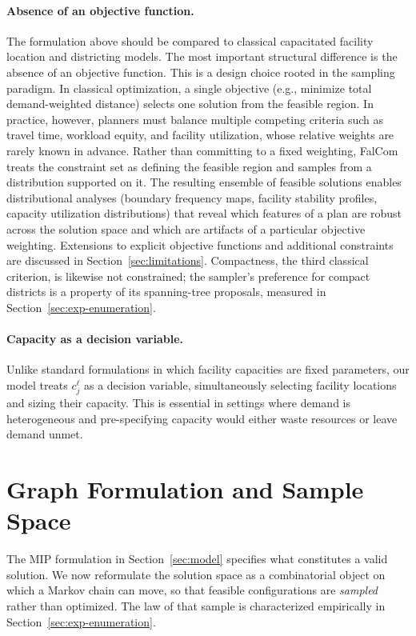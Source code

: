 \documentclass[preprint,12pt,authoryear]{elsarticle}
\theoremstyle{definition}
\begin{document}
\paragraph{Absence of an objective function.}
The formulation above should be compared to classical capacitated facility
location and districting models.  The most important structural difference is
the absence of an objective function.  This is a design choice
rooted in the sampling paradigm.  In classical optimization, a single objective
(e.g., minimize total demand-weighted distance) selects one solution from the
feasible region.  In practice, however, planners must balance multiple
competing criteria such as travel time, workload equity, and facility
utilization, whose relative weights are rarely known in advance.
Rather than committing to a fixed weighting, FalCom treats the constraint set
as defining the feasible region and samples from a distribution supported on
it.  The resulting ensemble of feasible solutions
enables distributional analyses (boundary frequency maps, facility stability
profiles, capacity utilization distributions) that reveal which features of a
plan are robust across the solution space and which are artifacts of a
particular objective weighting.  Extensions to
explicit objective functions and additional constraints are discussed in Section~\ref{sec:limitations}. Compactness, the third classical criterion, is likewise not constrained; the sampler's preference for compact districts is a property of its spanning-tree proposals, measured in Section~\ref{sec:exp-enumeration}.

\paragraph{Capacity as a decision variable.}
Unlike standard formulations in which facility capacities are fixed parameters,
our model treats $c^{\ell}_j$ as a decision variable, simultaneously selecting
facility locations and sizing their capacity.  This is essential in settings
where demand is heterogeneous and pre-specifying capacity would either waste
resources or leave demand unmet.

\section{Graph Formulation and Sample Space}
\label{sec:graph}

The MIP formulation in Section~\ref{sec:model} specifies what constitutes a
valid solution.  We now reformulate the solution space as a combinatorial object on which a Markov chain can move, so that feasible configurations are \emph{sampled} rather than optimized. The law of that sample is characterized empirically in Section~\ref{sec:exp-enumeration}.
\end{document}
